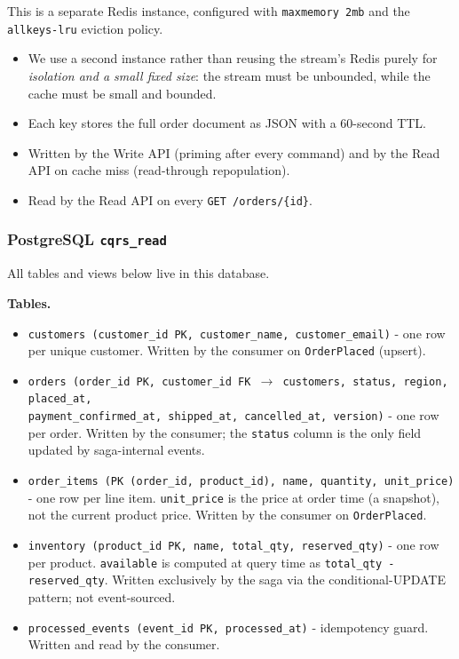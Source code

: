 \documentclass[11pt,a4paper]{article}
\newcommand{\code}[1]{\texttt{\small #1}}
\begin{document}
This is a separate Redis instance, configured with \code{maxmemory 2mb} and the \code{allkeys-lru} eviction policy.
  \begin{itemize}
    \item We use a second instance rather than reusing the stream's Redis purely for \emph{isolation and a small fixed size}: the stream must be unbounded, while the cache must be small and bounded.
    \item Each key stores the full order document as JSON with a 60-second TTL.
    \item Written by the Write API (priming after every command) and by the Read API on cache miss (read-through repopulation).
    \item Read by the Read API on every \code{GET /orders/\{id\}}.
  \end{itemize}

\subsubsection{PostgreSQL \code{cqrs\_read}}

All tables and views below live in this database.

\textbf{Tables.}

\begin{itemize}
  \item \code{customers (customer\_id PK, customer\_name, customer\_email)} - one row per unique customer. Written by the consumer on \code{OrderPlaced} (upsert).
  \item \code{orders (order\_id PK, customer\_id FK $\to$ customers, status, region, placed\_at,\\ payment\_confirmed\_at, shipped\_at, cancelled\_at, version)} - one row per order. Written by the consumer; the \code{status} column is the only field updated by saga-internal events.
  \item \code{order\_items (PK (order\_id, product\_id), name, quantity, unit\_price)} - one row per line item. \code{unit\_price} is the price at order time (a snapshot), not the current product price. Written by the consumer on \code{OrderPlaced}.
  \item \code{inventory (product\_id PK, name, total\_qty, reserved\_qty)} - one row per product. \code{available} is computed at query time as \code{total\_qty - reserved\_qty}. Written exclusively by the saga via the conditional-UPDATE pattern; not event-sourced.
  \item \code{processed\_events (event\_id PK, processed\_at)} - idempotency guard. Written and read by the consumer.
\end{itemize}
\end{document}
